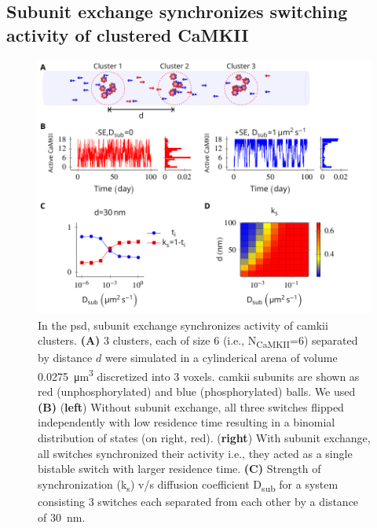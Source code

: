 \documentclass[9pt,lineno,doublespacing]{elife}
\newcommand\SUB[2]{#1\textsubscript{#2}}
\begin{document}

\subsection{Subunit exchange synchronizes switching activity of clustered CaMKII}
\label{subsec:se_sync_switches}

\begin{figure}%
    \includegraphics[width=0.95\linewidth]{./PaperFigures/elifeFigure5/figure_sync_150mm.pdf}
    \caption{In the \gls{psd}, subunit exchange synchronizes activity of
        \gls{camkii} clusters. 
        \textbf{(A)} 3 clusters, each of size 6 (i.e.,
        \SUB{N}{CaMKII}=6) separated by distance \(d\) were simulated in a
        cylinderical arena of volume \SI{0.0275}{\micro\meter^3} discretized
        into 3 voxels. \Gls{camkii} subunits are shown as red 
        (unphosphorylated) and blue (phosphorylated) balls. We used 
        \textbf{(B)} (\textbf{left}) Without subunit exchange, all three
        switches flipped independently with low residence time resulting in a
        binomial distribution of states (on right, red). (\textbf{right})
        With subunit exchange, all switches synchronized their activity i.e.,
        they acted as a single bistable switch with larger residence time.
        \textbf{(C)} Strength of synchronization (\SUB{k}{s})
        v/s diffusion coefficient \SUB{D}{sub} for a system consisting 3 switches
        each separated from each other by a distance of \SI{30}{\nano \meter}.
}
\end{figure}
\end{document}
